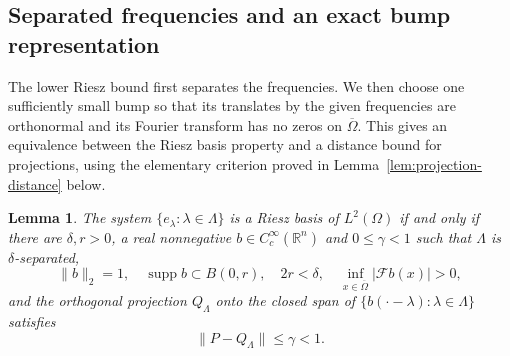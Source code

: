 \documentclass[a4paper,12pt,reqno]{amsart}
\newcommand{\lead}[1]{\par\smallskip\noindent\leavevmode#1\par\smallskip}
\newtheorem{lemma}[theorem]{Lemma}
\theoremstyle{remark}
\numberwithin{equation}{section}
\newcommand{\R}{\mathbb R}
\newcommand{\Ff}{\mathcal F}
\DeclareMathOperator{\supp}{supp}
\begin{document}
\subsection{Separated frequencies and an exact bump representation}

\lead{The lower Riesz bound first separates the frequencies. We then choose
one sufficiently small bump so that its translates by the given frequencies are orthonormal and its
Fourier transform has no zeros on $\overline\Omega$. This gives an equivalence between the Riesz basis property and a
distance bound for projections, using the elementary criterion proved
in Lemma~\ref{lem:projection-distance} below.}


\begin{lemma}\label{lem:bumps}
The system $\{e_\lambda:\lambda\in\Lambda\}$ is a Riesz basis of
$L^2(\Omega)$ if and only if there are $\delta,r>0$, a real nonnegative
$b\in C_c^\infty(\R^n)$ and $0\leq\gamma<1$ such that $\Lambda$ is
$\delta$-separated,
\begin{equation}\label{eq:bump}
 \|b\|_2=1,\quad \supp b\subset B(0,r),\quad 2r<\delta,
 \quad \inf_{x\in\overline\Omega}|\Ff b(x)|>0,
\end{equation}
and the orthogonal projection $Q_\Lambda$ onto the closed span of
$\{b(\cdot-\lambda):\lambda\in\Lambda\}$ satisfies
\begin{equation}\label{eq:initial-distance-bound}
 \|P-Q_\Lambda\|\leq\gamma<1.
\end{equation}
\end{lemma}
\end{document}
